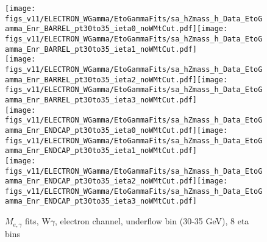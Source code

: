 \begin{figure}[htb]
  \begin{center}
   \texttt{[image: figs\_v11/ELECTRON\_WGamma/EtoGammaFits/sa\_hZmass\_h\_Data\_EtoGamma\_Enr\_BARREL\_pt30to35\_ieta0\_noWMtCut.pdf]}\texttt{[image: figs\_v11/ELECTRON\_WGamma/EtoGammaFits/sa\_hZmass\_h\_Data\_EtoGamma\_Enr\_BARREL\_pt30to35\_ieta1\_noWMtCut.pdf]}\\
   \texttt{[image: figs\_v11/ELECTRON\_WGamma/EtoGammaFits/sa\_hZmass\_h\_Data\_EtoGamma\_Enr\_BARREL\_pt30to35\_ieta2\_noWMtCut.pdf]}\texttt{[image: figs\_v11/ELECTRON\_WGamma/EtoGammaFits/sa\_hZmass\_h\_Data\_EtoGamma\_Enr\_BARREL\_pt30to35\_ieta3\_noWMtCut.pdf]}\\
   \texttt{[image: figs\_v11/ELECTRON\_WGamma/EtoGammaFits/sa\_hZmass\_h\_Data\_EtoGamma\_Enr\_ENDCAP\_pt30to35\_ieta0\_noWMtCut.pdf]}\texttt{[image: figs\_v11/ELECTRON\_WGamma/EtoGammaFits/sa\_hZmass\_h\_Data\_EtoGamma\_Enr\_ENDCAP\_pt30to35\_ieta1\_noWMtCut.pdf]}\\
   \texttt{[image: figs\_v11/ELECTRON\_WGamma/EtoGammaFits/sa\_hZmass\_h\_Data\_EtoGamma\_Enr\_ENDCAP\_pt30to35\_ieta2\_noWMtCut.pdf]}\texttt{[image: figs\_v11/ELECTRON\_WGamma/EtoGammaFits/sa\_hZmass\_h\_Data\_EtoGamma\_Enr\_ENDCAP\_pt30to35\_ieta3\_noWMtCut.pdf]}\\
  \label{fig:etogFits_30to35}
  \caption{$M_{e,\gamma}$ fits, W$\gamma$, electron channel, underflow bin (30-35 GeV), 8 eta bins}
  \end{center}
\end{figure}

